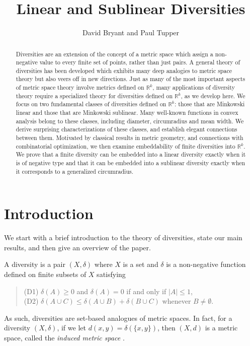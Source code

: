 \documentclass[11pt]{article}
\title{Linear and Sublinear Diversities}
\author{David Bryant and Paul Tupper}
\renewcommand{\Re}{\mathbb{R}}
\begin{document}
\maketitle



\begin{abstract}
Diversities are an extension of the concept of a metric space which assign a non-negative value to every finite set of points, rather than just pairs. A general theory of diversities has been developed which exhibits many deep analogies to metric space theory but  also veers off in  new directions. Just as many of the most important aspects of metric space theory involve metrics defined on $\Re^k$, many applications of diversity theory require a specialized theory for diversities defined on $\Re^k$, as we develop here. We focus on two fundamental classes of diversities defined on $\Re^k$: those that are  Minkowski linear and those that are Minkowski sublinear. 
Many well-known functions in convex analysis belong to these classes, including  diameter, circumradius and  mean width. We derive surprising characterizations of these classes, and establish elegant connections between them. Motivated by classical results in metric geometry, and connections with combinatorial optimization, we then examine embeddability of finite diversities into $\Re^k$. We prove that a finite diversity can be embedded into a linear diversity exactly when it is of negative type and that it can be embedded into a sublinear diversity exactly when it corresponds to a generalized circumradius.
\end{abstract}

\section{Introduction}


We start with a brief introduction to the theory of diversities, state our main results, and then give an overview of the paper.


A diversity \cite{BryantTupper12} is a pair $(X,\delta)$ where $X$ is a set and $\delta$ is a non-negative function defined on finite subsets of $X$ satisfying
\begin{quotation}
\noindent  (D1) $\delta(A)\geq 0$ and $\delta(A)=0$ if and only if $|A|\leq 1$,\\
(D2) $\delta(A \cup C) \leq \delta(A \cup B) + \delta(B \cup C)$ whenever $B \neq \emptyset$.
\end{quotation}
\noindent As such, diversities are  set-based analogues of metric spaces. 
In fact, for a diversity $(X,\delta)$, if we let $d(x,y)=\delta(\{x,y\})$, then $(X,d)$ is a metric space, called the {\em induced metric space} \cite{BryantTupper12}.
\end{document}
